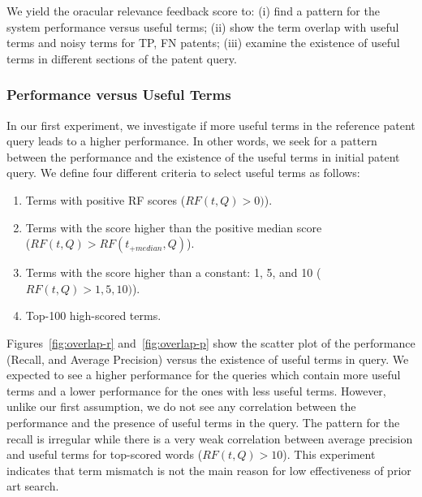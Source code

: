 We yield the oracular relevance feedback score to: (i) find a pattern for the system performance versus useful terms; (ii) show the term overlap with useful terms and noisy terms for TP, FN patents; (iii)  examine the existence of useful terms in different sections of the patent query.
\subsubsection{Performance versus Useful Terms}
\label{PerformanceUsefulTerms}
In our first experiment, we investigate if more useful terms in the reference patent query leads to a higher performance. In other words, we seek for a pattern between the performance and the existence of the useful terms in initial patent query. We define four different criteria to select useful terms as follows:
\begin{enumerate}
\item Terms with positive RF scores ($ RF(t, Q)>0) $).
\item Terms with the score higher than the positive median score\\ ($ RF(t, Q)>RF(t_{+median}, Q) $).
\item Terms with the score higher than a constant: 1, 5, and 10 ($ RF(t, Q)>1, 5, 10) $).
\item Top-100 high-scored terms.
\end{enumerate}

Figures~\ref{fig:overlap-r} and~\ref{fig:overlap-p} show the scatter plot of the performance (Recall, and Average Precision) versus the existence of useful terms in query. 
We expected to see a higher performance for the queries which contain more useful terms and a lower performance for the ones with less useful terms. However, unlike our first assumption, we do not see any correlation between the performance and the presence of useful terms in the query. The pattern for the recall is irregular while there is a very weak correlation between average precision and useful terms for top-scored words ($RF(t, Q)>10$). This experiment indicates that term mismatch is not the main reason for low effectiveness of prior art search. 
